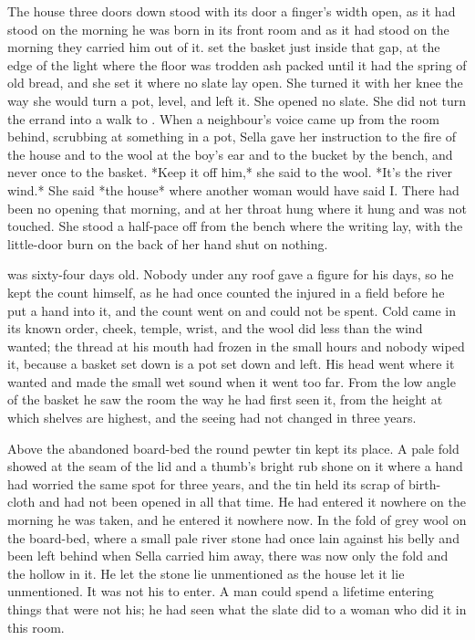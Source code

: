 
The house three doors down stood with its door a finger's width open, as it had stood on the morning he was born in its front room and as it had stood on the morning they carried him out of it.  set the basket just inside that gap, at the edge of the light where the floor was trodden ash packed until it had the spring of old bread, and she set it where no slate lay open. She turned it with her knee the way she would turn a pot, level, and left it. She opened no slate. She did not turn the errand into a walk to . When a neighbour's voice came up from the room behind, scrubbing at something in a pot, Sella gave her instruction to the fire of the house and to the wool at the boy's ear and to the bucket by the bench, and never once to the basket. *Keep it off him,* she said to the wool. *It's the river wind.* She said *the house* where another woman would have said I. There had been no opening that morning, and  at her throat hung where it hung and was not touched. She stood a half-pace off from the bench where the writing lay, with the little-door burn on the back of her hand shut on nothing.

 was sixty-four days old. Nobody under any roof gave a figure for his days, so he kept the count himself, as he had once counted the injured in a field before he put a hand into it, and the count went on and could not be spent. Cold came in its known order, cheek, temple, wrist, and the wool did less than the wind wanted; the thread at his mouth had frozen in the small hours and nobody wiped it, because a basket set down is a pot set down and left. His head went where it wanted and made the small wet sound when it went too far. From the low angle of the basket he saw the room the way he had first seen it, from the height at which shelves are highest, and the seeing had not changed in three years.

Above the abandoned board-bed the round pewter tin kept its place. A pale fold showed at the seam of the lid and a thumb's bright rub shone on it where a hand had worried the same spot for three years, and the tin held its scrap of birth-cloth and had not been opened in all that time. He had entered it nowhere on the morning he was taken, and he entered it nowhere now. In the fold of grey wool on the board-bed, where a small pale river stone had once lain against his belly and been left behind when Sella carried him away, there was now only the fold and the hollow in it. He let the stone lie unmentioned as the house let it lie unmentioned. It was not his to enter. A man could spend a lifetime entering things that were not his; he had seen what the slate did to a woman who did it in this room.

